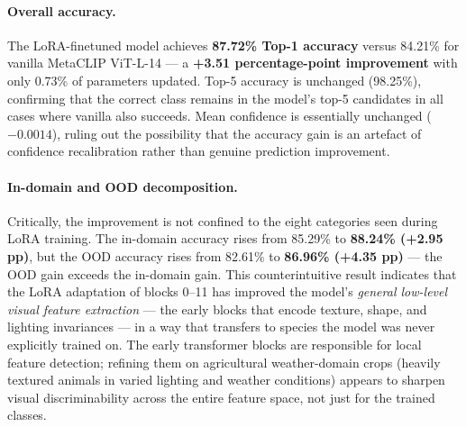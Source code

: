 \paragraph{Overall accuracy.}
The LoRA-finetuned model achieves \textbf{87.72\% Top-1 accuracy} versus 84.21\% for vanilla MetaCLIP ViT-L-14 --- a \textbf{+3.51 percentage-point improvement} with only 0.73\% of parameters updated. Top-5 accuracy is unchanged (98.25\%), confirming that the correct class remains in the model's top-5 candidates in all cases where vanilla also succeeds. Mean confidence is essentially unchanged ($-0.0014$), ruling out the possibility that the accuracy gain is an artefact of confidence recalibration rather than genuine prediction improvement.

\paragraph{In-domain and OOD decomposition.}
Critically, the improvement is not confined to the eight categories seen during LoRA training. The in-domain accuracy rises from 85.29\% to \textbf{88.24\% (+2.95 pp)}, but the OOD accuracy rises from 82.61\% to \textbf{86.96\% (+4.35 pp)} --- the OOD gain exceeds the in-domain gain. This counterintuitive result indicates that the LoRA adaptation of blocks 0--11 has improved the model's \emph{general low-level visual feature extraction} --- the early blocks that encode texture, shape, and lighting invariances --- in a way that transfers to species the model was never explicitly trained on. The early transformer blocks are responsible for local feature detection; refining them on agricultural weather-domain crops (heavily textured animals in varied lighting and weather conditions) appears to sharpen visual discriminability across the entire feature space, not just for the trained classes.

